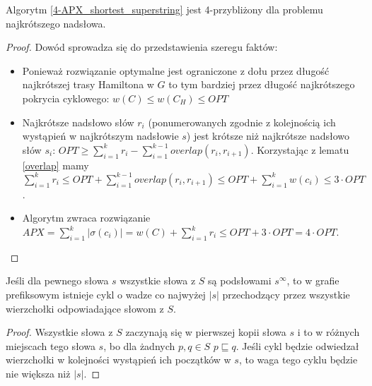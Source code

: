 \begin{theorem}
Algorytm \ref{4-APX_shortest_superstring} jest 4-przybliżony dla problemu najkrótszego nadsłowa.
\end{theorem}
\begin{proof}
Dowód sprowadza się do przedstawienia szeregu faktów:
\begin{itemize}
\item Ponieważ rozwiązanie optymalne jest ograniczone z dołu przez długość najkrótszej trasy Hamiltona w $G$ to tym bardziej przez długość najkrótszego pokrycia cyklowego: $w(C) \leq w(C_H) \leq OPT$
\item Najkrótsze nadsłowo słów $r_i$ (ponumerowanych zgodnie z kolejnością ich wystąpień w najkrótszym nadsłowie $s$) jest krótsze niż najkrótsze nadsłowo słów $s_i$: $OPT \geq \sum\limits_{i = 1}^k r_i - \sum\limits_{i = 1}^{k - 1} overlap(r_i, r_{i + 1})$. Korzystając z lematu \ref{overlap} mamy $\sum\limits_{i = 1}^k r_i \leq OPT + \sum\limits_{i = 1}^{k - 1} overlap(r_i, r_{i + 1}) \leq OPT + \sum\limits_{i = 1}^k w(c_i) \leq 3 \cdot OPT$.
\item Algorytm zwraca rozwiązanie $APX = \sum\limits_{i = 1}^k |\sigma(c_i)| = w(C) + \sum\limits_{i = 1}^k r_i \leq OPT + 3 \cdot OPT = 4 \cdot OPT$.
\end{itemize}
\end{proof}

\begin{lemma}
\label{cycle}
Jeśli dla pewnego słowa $s$ wszystkie słowa z $S$ są podsłowami $s^\infty$, to w grafie prefiksowym istnieje cykl o wadze co najwyżej $|s|$ przechodzący przez wszystkie wierzchołki odpowiadające słowom z $S$.
\end{lemma}
\begin{proof}
Wszystkie słowa z $S$ zaczynają się w pierwszej kopii słowa $s$ i to w różnych miejscach tego słowa $s$, bo dla żadnych $p, q \in S$ $p \sqsubseteq q$. Jeśli cykl będzie odwiedzał wierzchołki w kolejności wystąpień ich początków w $s$, to waga tego cyklu będzie nie większa niż $|s|$.
\end{proof}

